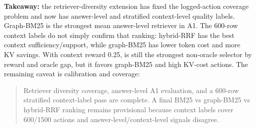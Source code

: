 \textbf{Takeaway:} the retriever-diversity extension has fixed the logged-action coverage problem and now has answer-level and stratified context-level quality labels. Graph-BM25 is the strongest mean answer-level retriever in A1. The 600-row context labels do not simply confirm that ranking: hybrid-RRF has the best context sufficiency/support, while graph-BM25 has lower token cost and more KV savings. With context reward 0.25,  is still the strongest non-oracle selector by reward and oracle gap, but it favors graph-BM25 and high KV-cost actions. The remaining caveat is calibration and coverage:

\begin{quote}
Retriever diversity coverage, answer-level A1 evaluation, and a 600-row stratified context-label pass are complete. A final BM25 vs graph-BM25 vs hybrid-RRF ranking remains provisional because context labels cover 600/1500 actions and answer-level/context-level signals disagree.
\end{quote}
